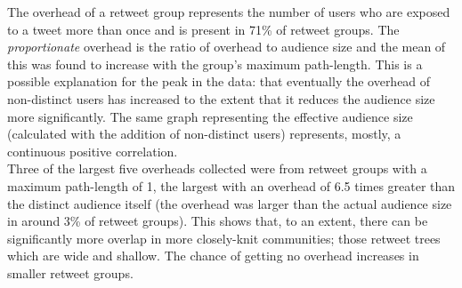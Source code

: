 The overhead of a retweet group represents the number of users who are exposed to a tweet more than once and is present in 71\% of retweet groups. The \textit{proportionate} overhead is the ratio of overhead to audience size and the mean of this was found to increase with the group's maximum path-length. This is a possible explanation for the peak in the data: that eventually the overhead of non-distinct users has increased to the extent that it reduces the audience size more significantly. The same graph representing the effective audience size (calculated with the addition of non-distinct users) represents, mostly, a continuous positive correlation.\\
Three of the largest five overheads collected were from retweet groups with a maximum path-length of 1, the largest with an overhead of 6.5 times greater than the distinct audience itself (the overhead was larger than the actual audience size in around 3\% of retweet groups). This shows that, to an extent, there can be significantly more overlap in more closely-knit communities; those retweet trees which are wide and shallow. The chance of getting no overhead increases in smaller retweet groups.


